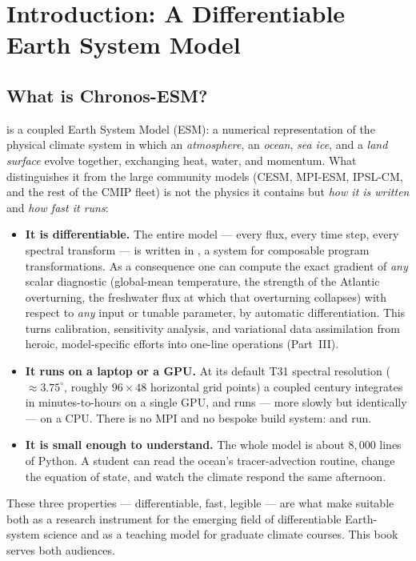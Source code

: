 \chapter{Introduction: A Differentiable Earth System Model}
\label{chap:ch01_introduction}

\section{What is Chronos-ESM?}

\model{} is a coupled Earth System Model (ESM): a numerical representation of the physical
climate system in which an \emph{atmosphere}, an \emph{ocean}, \emph{sea ice}, and a
\emph{land surface} evolve together, exchanging heat, water, and momentum. What distinguishes
it from the large community models (CESM, MPI-ESM, IPSL-CM, and the rest of the CMIP fleet)
is not the physics it contains but \emph{how it is written} and \emph{how fast it runs}:

\begin{itemize}[leftmargin=1.4em]
  \item \textbf{It is differentiable.} The entire model --- every flux, every time step, every
    spectral transform --- is written in \jax{} \citep{jax2018}, a system for composable
    program transformations. As a consequence one can compute the exact gradient of \emph{any}
    scalar diagnostic (global-mean temperature, the strength of the Atlantic overturning, the
    freshwater flux at which that overturning collapses) with respect to \emph{any} input or
    tunable parameter, by automatic differentiation. This turns calibration, sensitivity
    analysis, and variational data assimilation from heroic, model-specific efforts into
    one-line operations (Part~III).
  \item \textbf{It runs on a laptop or a GPU.} At its default T31 spectral resolution
    ($\approx 3.75^\circ$, roughly $96\times48$ horizontal grid points) a coupled century
    integrates in minutes-to-hours on a single GPU, and runs --- more slowly but identically
    --- on a CPU. There is no MPI and no bespoke build system:  and run.
  \item \textbf{It is small enough to understand.} The whole model is about $8{,}000$ lines of
    Python. A student can read the ocean's tracer-advection routine, change the equation of
    state, and watch the climate respond the same afternoon.
\end{itemize}

These three properties --- differentiable, fast, legible --- are what make \model{} suitable
both as a research instrument for the emerging field of differentiable Earth-system science
and as a teaching model for graduate climate courses. This book serves both audiences.


